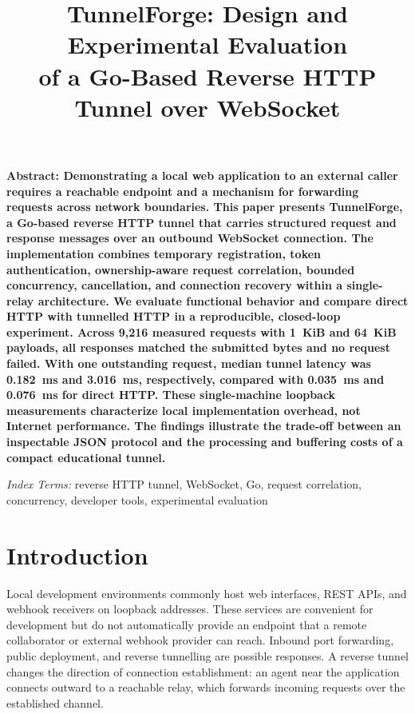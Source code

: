 \documentclass[conference,letterpaper]{IEEEtran}
\renewenvironment{abstract}
  {\small\bfseries\noindent Abstract: \ignorespaces}
  {\par\smallskip}
\renewenvironment{IEEEkeywords}
  {\small\noindent\textit{Index Terms: }\ignorespaces}
  {\par\smallskip}
\begin{document}
\title{TunnelForge: Design and Experimental Evaluation\\
of a Go-Based Reverse HTTP Tunnel over WebSocket}

\author{
}
\maketitle

\begin{abstract}
Demonstrating a local web application to an external caller requires a reachable
endpoint and a mechanism for forwarding requests across network boundaries.
This paper presents TunnelForge, a Go-based reverse HTTP tunnel that carries
structured request and response messages over an outbound WebSocket connection.
The implementation combines temporary registration, token authentication,
ownership-aware request correlation, bounded concurrency, cancellation, and
connection recovery within a single-relay architecture. We evaluate functional
behavior and compare direct HTTP with tunnelled HTTP in a reproducible,
closed-loop experiment. Across 9,216 measured requests with 1~KiB and 64~KiB
payloads, all responses matched the submitted bytes and no request failed.
With one outstanding request, median tunnel latency was 0.182~ms and 3.016~ms,
respectively, compared with 0.035~ms and 0.076~ms for direct HTTP. These
single-machine loopback measurements characterize local implementation overhead,
not Internet performance. The findings illustrate the trade-off between an
inspectable JSON protocol and the processing and buffering costs of a compact
educational tunnel.
\end{abstract}

\begin{IEEEkeywords}
reverse HTTP tunnel, WebSocket, Go, request correlation, concurrency,
developer tools, experimental evaluation
\end{IEEEkeywords}

\section{Introduction}
Local development environments commonly host web interfaces, REST APIs, and
webhook receivers on loopback addresses. These services are convenient for
development but do not automatically provide an endpoint that a remote
collaborator or external webhook provider can reach. Inbound port forwarding,
public deployment, and reverse tunnelling are possible responses. A reverse
tunnel changes the direction of connection establishment: an agent near the
application connects outward to a reachable relay, which forwards incoming
requests over the established channel.
\end{document}

